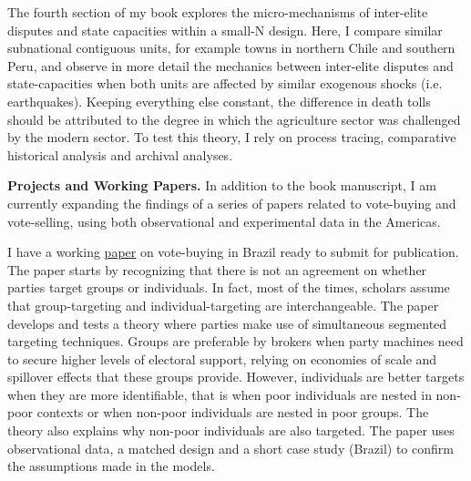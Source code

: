 \documentclass[11pt]{letter} %
\begin{document}
\begin{letter}{}
The fourth section of my book explores the micro-mechanisms of inter-elite disputes and state capacities within a small-N design. Here, I compare similar subnational contiguous units, for example towns in northern Chile and southern Peru, and observe in more detail the mechanics between inter-elite disputes and state-capacities when both units are affected by similar exogenous shocks (i.e. earthquakes). Keeping everything else constant, the difference in death tolls should be attributed to the degree in which the agriculture sector was challenged by the modern sector. To test this theory, I rely on process tracing, comparative historical analysis and archival analyses. 

{\bf Projects and Working Papers.} In addition to the book manuscript, I am currently expanding the findings of a series of papers related to vote-buying and vote-selling, using both observational and experimental data in the Americas. 

I have a working \href{https://github.com/hbahamonde/Clientelism_paper/raw/master/Bahamonde_Clientelism_Paper.pdf}{paper} on vote-buying in Brazil ready to submit for publication. The paper starts by recognizing that there is not an agreement on whether parties target groups or individuals. In fact, most of the times, scholars assume that group-targeting and individual-targeting are interchangeable. The paper develops and tests a theory where parties make use of simultaneous segmented targeting techniques. Groups are preferable by brokers when party machines need to secure higher levels of electoral support, relying on economies of scale and spillover effects that these groups provide. However, individuals are better targets when they are more identifiable, that is when poor individuals are nested in non-poor contexts or when non-poor individuals are nested in poor groups. The theory also explains why non-poor individuals are also targeted. The paper uses observational data, a matched design and a short case study (Brazil) to confirm the assumptions made in the models.



\end{letter}
\end{document}
